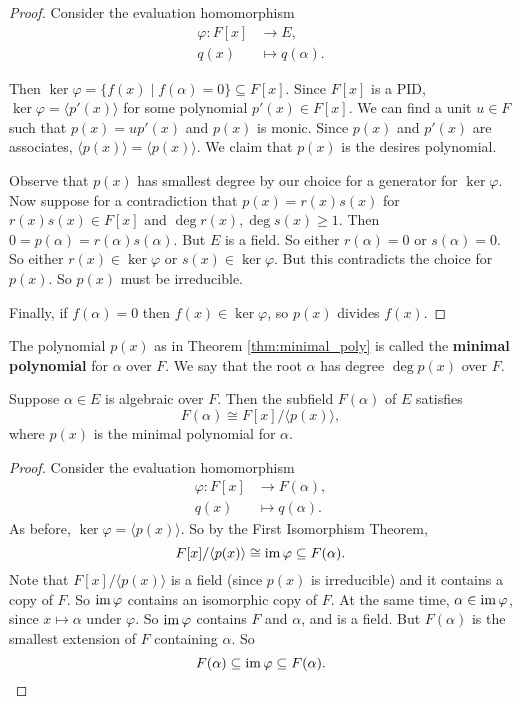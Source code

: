 \begin{proof}
	Consider the evaluation homomorphism
	\begin{align*}
		\varphi\colon F[x]&\to E,\\
		q(x)&\mapsto q(\alpha).
	\end{align*}

	Then $\ker\varphi=\{f(x)\mid f(\alpha)=0\}\subseteq F[x]$. Since $F[x]$ is a PID, $\ker\varphi=\langle p'(x)\rangle$ for some polynomial $p'(x)\in F[x]$. We can find a unit $u\in F$ such that $p(x)=up'(x)$ and $p(x)$ is monic. Since $p(x)$ and $p'(x)$ are associates, $\langle p(x)\rangle=\langle p(x)\rangle$. We claim that $p(x)$ is the desires polynomial.

	Observe that $p(x)$ has smallest degree by our choice for a generator for $\ker\varphi$. Now suppose for a contradiction that $p(x)=r(x)s(x)$ for $r(x)s(x)\in F[x]$ and $\deg r(x),\deg s(x)\geq 1$. Then $0=p(\alpha)=r(\alpha)s(\alpha)$. But $E$ is a field. So either $r(\alpha)=0$ or $s(\alpha)=0$. So either $r(x)\in\ker\varphi$ or $s(x)\in\ker\varphi$. But this contradicts the choice for $p(x)$. So $p(x)$ must be irreducible.

	Finally, if $f(\alpha)=0$ then $f(x)\in\ker\varphi$, so $p(x)$ divides $f(x)$.
\end{proof}

\begin{definition}
	The polynomial $p(x)$ as in Theorem \ref{thm:minimal_poly} is called the \textbf{minimal polynomial} for $\alpha$ over $F$. We say that the root $\alpha$ has degree $\deg p(x)$ over $F$.
\end{definition}

\begin{theorem}
	Suppose $\alpha\in E$ is algebraic over $F$. Then the subfield $F(\alpha)$ of $E$ satisfies
	$$F(\alpha)\cong F[x]/\langle p(x)\rangle,$$
	where $p(x)$ is the minimal polynomial for $\alpha$.
\end{theorem}

\begin{proof}
	Consider the evaluation homomorphism
	\begin{align*}
		\varphi\colon F[x]&\to F(\alpha),\\
		q(x)&\mapsto q(\alpha).
	\end{align*}
	As before, $\ker\varphi=\langle p(x)\rangle$. So by the First Isomorphism Theorem,
	$$F[x]/\langle p(x)\rangle\cong\operatorname{im}\varphi\subseteq F(\alpha).$$
	Note that $F[x]/\langle p(x)\rangle$ is a field (since $p(x)$ is irreducible) and it contains a copy of $F$. So $\operatorname{im}\varphi$ contains an isomorphic copy of $F$. At the same time, $\alpha\in\operatorname{im}\varphi$, since $x\mapsto\alpha$ under $\varphi$. So $\operatorname{im}\varphi$ contains $F$ and $\alpha$, and is a field. But $F(\alpha)$ is the smallest extension of $F$ containing $\alpha$. So
	$$F(\alpha)\subseteq\operatorname{im}\varphi\subseteq F(\alpha).$$
\end{proof}

